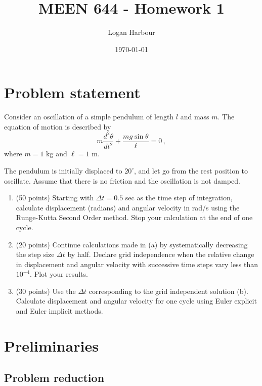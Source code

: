 \documentclass{article}
\newcommand{\pageTitle}{MEEN 644 - Homework 1}
\newcommand{\pageAuthor}{Logan Harbour}
\begin{document}
\title{\LARGE \textbf{\pageTitle} \vspace{-0.3cm}}
\author{\large \pageAuthor}
\date{\vspace{-0.6cm} \large \today \vspace{-0.4cm}}

\maketitle

\section*{Problem statement}

Consider an oscillation of a simple pendulum of length $l$ and mass $m$. The equation of motion is described by
\[
	m \frac{d^2 \theta}{d t^2} + \frac{mg \sin \theta}{\ell} = 0\,,
\]
where $m = 1$ kg and $\ell = 1$ m.

The pendulum is initially displaced to $20^\circ$, and let go from the rest position to oscillate. Assume that there is no friction and the oscillation is not damped.
\begin{enumerate}[label=(\alph*)]
	\item (50 points) Starting with $\Delta t = 0.5$ sec as the time step of integration, calculate displacement (radians) and angular velocity in rad/s using the Runge-Kutta Second Order method. Stop your calculation at the end of one cycle.
	\item (20 points) Continue calculations made in (a) by systematically decreasing the step size $\Delta t$ by half. Declare grid independence when the relative change in displacement and angular velocity with successive time steps vary less than $10^{-4}$. Plot your results.
	\item (30 points) Use the $\Delta t$ corresponding to the grid independent solution (b). Calculate displacement and angular velocity for one cycle using Euler explicit and Euler implicit methods.
\end{enumerate}

\section*{Preliminaries}

\subsection*{Problem reduction}
\end{document}
